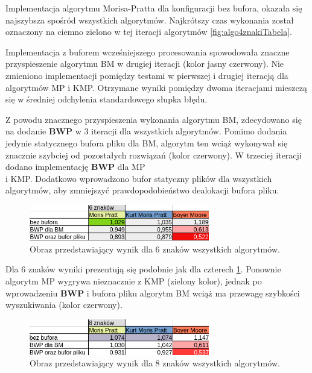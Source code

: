 Implementacja algorytmu Morisa-Pratta dla konfiguracji bez bufora, okazała się
najszybsza spośród wszystkich algorytmów. Najkrótszy czas wykonania został
oznaczony na ciemno zielono w tej iteracji algorytmów \ref{fig:algo4znakiTabela}.

Implementacja z buforem wcześniejszego procesowania spowodowała znaczne
przyspieszenie algorytmu BM w drugiej iteracji (kolor jasny czerwony). Nie zmieniono implementacji
pomiędzy testami w pierwszej i drugiej iteracją dla algorytmów MP i KMP.
Otrzymane wyniki pomiędzy dwoma iteracjami mieszczą się w średniej odchylenia 
standardowego słupka błędu. 

Z powodu znacznego przyspieszenia wykonania algorytmu BM, zdecydowano się na
dodanie \textbf{BWP} w 3 iteracji dla wszystkich algorytmów. Pomimo dodania jedynie 
statycznego bufora pliku dla BM, algorytm ten wciąż wykonywał się znacznie
szybciej od pozostałych rozwiązań (kolor czerwony). W trzeciej iteracji dodano implementację 
\textbf{BWP} dla MP \\ i KMP. Dodatkowo wprowadzono bufor statyczny
plików dla wszystkich algorytmów, aby zmniejszyć
prawdopodobieństwo dealokacji bufora pliku.

\begin{figure}[htb]
    \centering
    \includegraphics[width=0.7\textwidth]{./images/tabela-algo-6-znakow.png}
    \caption{Obraz przedstawiający wynik dla 6 znaków wszystkich algorytmów.}
    \label{fig:algo6znakowTabela}
\end{figure}

Dla 6 znaków wyniki prezentują się podobnie jak dla czterech
\ref{fig:algo6znakowTabela}. Ponownie algorytm MP wygrywa nieznacznie z KMP 
(zielony kolor), jednak po wprowadzeniu \textbf{BWP} i bufora pliku algorytm BM
wciąż ma przewagę szybkości wyszukiwania (kolor czerwony).

\begin{figure}[htb]
    \centering
    \includegraphics[width=0.7\textwidth]{./images/tabela-algo-8-znakow.png}
    \caption{Obraz przedstawiający wynik dla 8 znaków wszystkich algorytmów.}
    \label{fig:algo8znakowTabela}
\end{figure}

